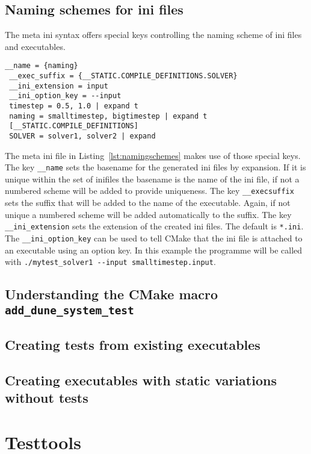 \documentclass[11pt]{article}
\begin{document}
\subsection{Naming schemes for ini files}
\label{sec:namingschemes}
The meta ini syntax offers special keys controlling the naming scheme of ini files and executables.
\begin{lstlisting}[caption={Meta ini file using the special keys for setting the naming scheme},label=lst:namingschemes]
 __name = {naming}
 __exec_suffix = {__STATIC.COMPILE_DEFINITIONS.SOLVER}
 __ini_extension = input
 __ini_option_key = --input
 timestep = 0.5, 1.0 | expand t
 naming = smalltimestep, bigtimestep | expand t
 [__STATIC.COMPILE_DEFINITIONS]
 SOLVER = solver1, solver2 | expand
\end{lstlisting}
The meta ini file in Listing~\ref{lst:namingschemes} makes use of those special keys. The key \lstinline!__name! sets the basename for the
generated ini files by expansion. If it is unique within the set of inifiles the basename is the name of the ini file, if not a numbered scheme
will be added to provide uniqueness. The key \lstinline!__execsuffix! sets the suffix that will be added to the name of the executable. Again,
if not unique a numbered scheme will be added automatically to the suffix. The key \lstinline!__ini_extension! sets the extension of the created
ini files. The default is \lstinline!*.ini!. The \lstinline!__ini_option_key! can be used to tell CMake that the ini file is attached to an
executable using an option key. In this example the programme will be called with \lstinline!./mytest_solver1 --input smalltimestep.input!.

\subsection{Understanding the CMake macro \lstinline!add_dune_system_test!}

\subsection{Creating tests from existing executables}
\subsection{Creating executables with static variations without tests}

\section{Testtools}
\label{sec:testtools}
\end{document}
